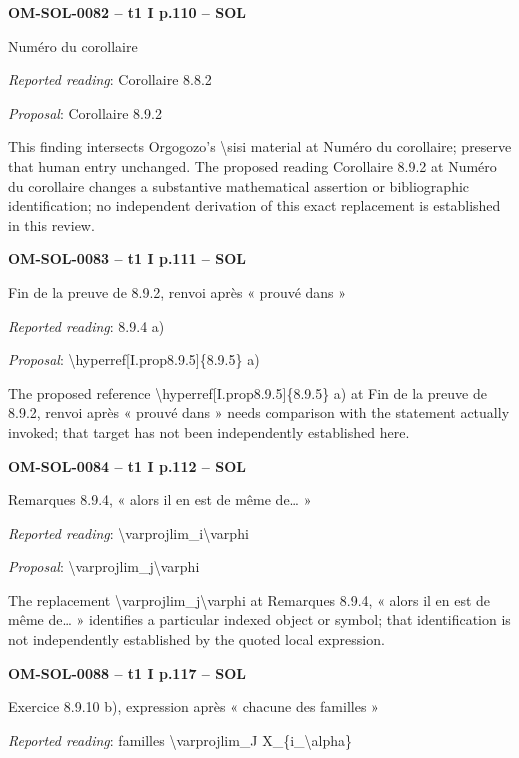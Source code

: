 \par\noindent\textbf{OM-SOL-0082 -- t1 I p.110 -- SOL}\par
Numéro du corollaire\par
\emph{Reported reading}: Corollaire 8.8.2\par
\emph{Proposal}: Corollaire 8.9.2\par
This finding intersects Orgogozo's \textbackslash{}sisi material at Numéro du corollaire; preserve that human entry unchanged. The proposed reading Corollaire 8.9.2 at Numéro du corollaire changes a substantive mathematical assertion or bibliographic identification; no independent derivation of this exact replacement is established in this review.\par
\par\noindent\textbf{OM-SOL-0083 -- t1 I p.111 -- SOL}\par
Fin de la preuve de 8.9.2, renvoi après « prouvé dans »\par
\emph{Reported reading}: 8.9.4 a)\par
\emph{Proposal}: \textbackslash{}hyperref[I.prop8.9.5]\{8.9.5\} a)\par
The proposed reference \textbackslash{}hyperref[I.prop8.9.5]\{8.9.5\} a) at Fin de la preuve de 8.9.2, renvoi après « prouvé dans » needs comparison with the statement actually invoked; that target has not been independently established here.\par
\par\noindent\textbf{OM-SOL-0084 -- t1 I p.112 -- SOL}\par
Remarques 8.9.4, « alors il en est de même de… »\par
\emph{Reported reading}: \textbackslash{}varprojlim\_i\textbackslash{}varphi\par
\emph{Proposal}: \textbackslash{}varprojlim\_j\textbackslash{}varphi\par
The replacement \textbackslash{}varprojlim\_j\textbackslash{}varphi at Remarques 8.9.4, « alors il en est de même de… » identifies a particular indexed object or symbol; that identification is not independently established by the quoted local expression.\par
\par\noindent\textbf{OM-SOL-0088 -- t1 I p.117 -- SOL}\par
Exercice 8.9.10 b), expression après « chacune des familles »\par
\emph{Reported reading}: familles \textbackslash{}varprojlim\_J X\_\{i\_\textbackslash{}alpha\}\par
